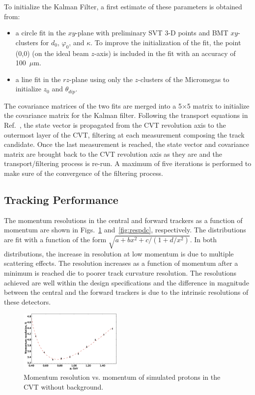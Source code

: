 To initialize the Kalman Filter, a first estimate of these parameters is obtained from:

\begin{itemize}
\item a circle fit in the $xy$-plane with preliminary SVT 3-D points and BMT $xy$-clusters for $d_0$,
  $\varphi_0$, and $\kappa$. To improve the initialization of the fit, the point (0,0) (on the ideal beam $z$-axis)
  is included in the fit with an accuracy of 100~$\mu$m.
\item a line fit in the $rz$-plane using only the $z$-clusters of the Micromegas to initialize $z_0$ and $\theta_{dip}$.
\end{itemize}

The covariance matrices of the two fits are merged into a 5$\times$5 matrix to initialize the covariance matrix
for the Kalman filter. Following the transport equations in Ref.~\cite{ILC-Tracking}, the state vector is
propagated from the CVT revolution axis to the outermost layer of the CVT, filtering at each measurement
composing the track candidate. Once the last measurement is reached, the state vector and covariance matrix
are brought back to the CVT revolution axis as they are and the transport/filtering process is re-run. A maximum
of five iterations is performed to make sure of the convergence of the filtering process.

\subsection{Tracking Performance}

The momentum resolutions in the central and forward trackers as a function of momentum are shown in
Figs.~\ref{fig:respcvt} and~\ref{fig:respdc}, respectively. The distributions are fit with a function of the form
$\sqrt{a+b x^2+c/(1+d/x^2)}$.  In both distributions, the increase in resolution at low momentum is due to multiple scattering effects.  The resolution increases as a function of momentum after a minimum is reached die to poorer track curvature resolution.  The resolutions achieved are well within the design specifications and the
difference in magnitude between the central and the forward trackers is due to the intrinsic resolutions of these
detectors. 

\begin{figure}
\includegraphics[width=0.45\textwidth]{pics/fddegipekmpjjiho.png}
\caption{Momentum resolution vs. momentum of simulated protons in the CVT without background.}
\label{fig:respcvt}
\end{figure}

